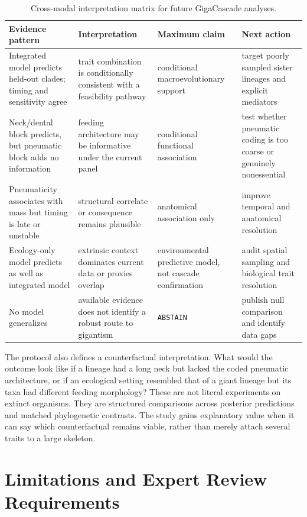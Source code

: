 \documentclass[conference]{IEEEtran}
\newcommand{\gc}{GigaCascade}
\newcommand{\abstain}{\texttt{ABSTAIN}}
\begin{document}
\begin{table}[!t]
\caption{Cross-modal interpretation matrix for future \gc{} analyses.}
\label{tab:concordance}
\centering
\scriptsize
\begin{tabular}{|p{}|p{}|p{}|p{}|}
\hline
Evidence pattern & Interpretation & Maximum claim & Next action \\
\hline
Integrated model predicts held-out clades; timing and sensitivity agree & trait combination is conditionally consistent with a feasibility pathway & conditional macroevolutionary support & target poorly sampled sister lineages and explicit mediators \\
\hline
Neck/dental block predicts, but pneumatic block adds no information & feeding architecture may be informative under the current panel & conditional functional association & test whether pneumatic coding is too coarse or genuinely nonessential \\
\hline
Pneumaticity associates with mass but timing is late or unstable & structural correlate or consequence remains plausible & anatomical association only & improve temporal and anatomical resolution \\
\hline
Ecology-only model predicts as well as integrated model & extrinsic context dominates current data or proxies overlap & environmental predictive model, not cascade confirmation & audit spatial sampling and biological trait resolution \\
\hline
No model generalizes & available evidence does not identify a robust route to gigantism & \abstain{} & publish null comparison and identify data gaps \\
\hline
\end{tabular}
\end{table}

The protocol also defines a counterfactual interpretation. What would the outcome look like if a lineage had a long neck but lacked the coded pneumatic architecture, or if an ecological setting resembled that of a giant lineage but its taxa had different feeding morphology? These are not literal experiments on extinct organisms. They are structured comparisons across posterior predictions and matched phylogenetic contrasts. The study gains explanatory value when it can say which counterfactual remains viable, rather than merely attach several traits to a large skeleton.

\section{Limitations and Expert Review Requirements}
\end{document}

